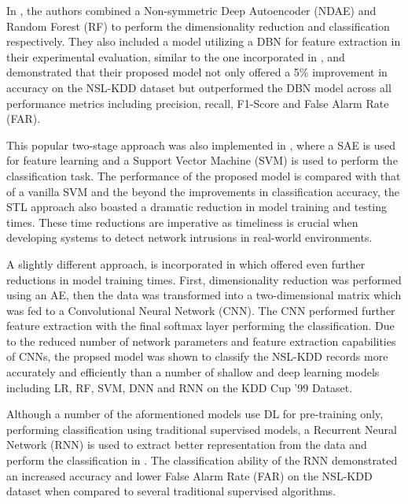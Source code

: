 \documentclass[conference]{IEEEtran}
\begin{document}
In \cite{b10}, the authors combined a Non-symmetric Deep Autoencoder (NDAE) and Random Forest (RF) to perform the dimensionality reduction and classification respectively. They also included a model utilizing a DBN for feature extraction in their experimental evaluation, similar to the one incorporated in \cite{b6}, and demonstrated that their proposed model not only offered a 5\% improvement in accuracy on the NSL-KDD dataset but outperformed the DBN model across all performance metrics including precision, recall, F1-Score and False Alarm Rate (FAR). 

This popular two-stage approach was also implemented in \cite{al}, where a SAE is used for feature learning and a Support Vector Machine (SVM) is used to perform the classification task. The performance of the proposed model is compared with that of a vanilla SVM and the beyond the improvements in classification accuracy, the STL approach also boasted a dramatic reduction in model training and testing times. These time reductions are imperative as timeliness is crucial when developing systems to detect network intrusions in real-world environments.

A slightly different approach, is incorporated in \cite{xiao} which offered even further reductions in model training times. First, dimensionality reduction was performed using an AE, then the data was transformed into a two-dimensional matrix which was fed to a Convolutional Neural Network (CNN). The CNN performed further feature extraction with the final softmax layer performing the classification. Due to the reduced number of network parameters and feature extraction capabilities of CNNs, the propsed model was shown to classify the NSL-KDD records more accurately and efficiently than a number of shallow and deep learning models including LR, RF, SVM, DNN and RNN on the KDD Cup '99 Dataset.

Although a number of the aformentioned models use DL for pre-training only, performing classification using traditional supervised models, a Recurrent Neural Network (RNN) is used to extract better representation from the data and perform the classification in \cite{b8}. The classification ability of the RNN demonstrated an increased accuracy and lower False Alarm Rate (FAR) on the NSL-KDD dataset when compared to several traditional supervised algorithms. 

\end{document}
